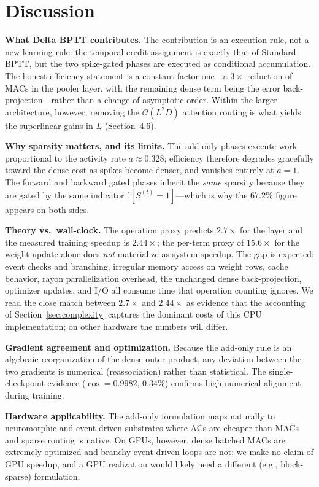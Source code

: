 \documentclass[10pt,journal,compsoc]{IEEEtran}
\begin{document}
\section{Discussion}
\textbf{What Delta BPTT contributes.} The contribution is an execution rule, not a new learning rule: the temporal credit assignment is exactly that of Standard BPTT, but the two spike-gated phases are executed as conditional accumulation. The honest efficiency statement is a constant-factor one---a $3\times$ reduction of MACs in the pooler layer, with the remaining dense term being the error back-projection---rather than a change of asymptotic order. Within the larger architecture, however, removing the $\mathcal{O}(L^2 D)$ attention routing is what yields the superlinear gains in $L$ (Section~4.6).

\textbf{Why sparsity matters, and its limits.} The add-only phases execute work proportional to the activity rate $a \approx 0.328$; efficiency therefore degrades gracefully toward the dense cost as spikes become denser, and vanishes entirely at $a = 1$. The forward and backward gated phases inherit the \emph{same} sparsity because they are gated by the same indicator $\mathbb{I}[S^{(t)}=1]$---which is why the $67.2\%$ figure appears on both sides.

\textbf{Theory vs.\ wall-clock.} The operation proxy predicts $2.7\times$ for the layer and the measured training speedup is $2.44\times$; the per-term proxy of $15.6\times$ for the weight update alone does \emph{not} materialize as system speedup. The gap is expected: event checks and branching, irregular memory access on weight rows, cache behavior, rayon parallelization overhead, the unchanged dense back-projection, optimizer updates, and I/O all consume time that operation counting ignores. We read the close match between $2.7\times$ and $2.44\times$ as evidence that the accounting of Section~\ref{sec:complexity} captures the dominant costs of this CPU implementation; on other hardware the numbers will differ.

\textbf{Gradient agreement and optimization.} Because the add-only rule is an algebraic reorganization of the dense outer product, any deviation between the two gradients is numerical (reassociation) rather than statistical. The single-checkpoint evidence ($\cos = 0.9982$, $0.34\%$) confirms high numerical alignment during training.

\textbf{Hardware applicability.} The add-only formulation maps naturally to neuromorphic and event-driven substrates where ACs are cheaper than MACs and sparse routing is native. On GPUs, however, dense batched MACs are extremely optimized and branchy event-driven loops are not; we make no claim of GPU speedup, and a GPU realization would likely need a different (e.g., block-sparse) formulation.
\end{document}
